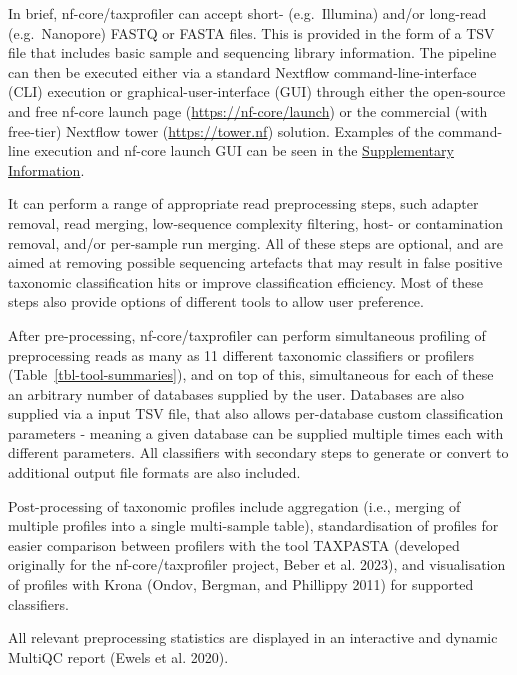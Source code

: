 \documentclass[
]{article}
\begin{document}
In brief, nf-core/taxprofiler can accept short- (e.g.~Illumina) and/or
long-read (e.g.~Nanopore) FASTQ or FASTA files. This is provided in the
form of a TSV file that includes basic sample and sequencing library
information. The pipeline can then be executed either via a standard
Nextflow command-line-interface (CLI) execution or
graphical-user-interface (GUI) through either the open-source and free
nf-core launch page (\url{https://nf-core/launch}) or the commercial
(with free-tier) Nextflow tower (\url{https://tower.nf}) solution.
Examples of the command-line execution and nf-core launch GUI can be
seen in the \protect\hyperlink{supplementary-information}{Supplementary
Information}.

It can perform a range of appropriate read preprocessing steps, such
adapter removal, read merging, low-sequence complexity filtering, host-
or contamination removal, and/or per-sample run merging. All of these
steps are optional, and are aimed at removing possible sequencing
artefacts that may result in false positive taxonomic classification
hits or improve classification efficiency. Most of these steps also
provide options of different tools to allow user preference.

After pre-processing, nf-core/taxprofiler can perform simultaneous
profiling of preprocessing reads as many as 11 different taxonomic
classifiers or profilers (Table~\ref{tbl-tool-summaries}), and on top of
this, simultaneous for each of these an arbitrary number of databases
supplied by the user. Databases are also supplied via a input TSV file,
that also allows per-database custom classification parameters - meaning
a given database can be supplied multiple times each with different
parameters. All classifiers with secondary steps to generate or convert
to additional output file formats are also included.

Post-processing of taxonomic profiles include aggregation (i.e., merging
of multiple profiles into a single multi-sample table), standardisation
of profiles for easier comparison between profilers with the tool
TAXPASTA (developed originally for the nf-core/taxprofiler project,
Beber et al. 2023), and visualisation of profiles with Krona (Ondov,
Bergman, and Phillippy 2011) for supported classifiers.

All relevant preprocessing statistics are displayed in an interactive
and dynamic MultiQC report (Ewels et al. 2020).
\end{document}
